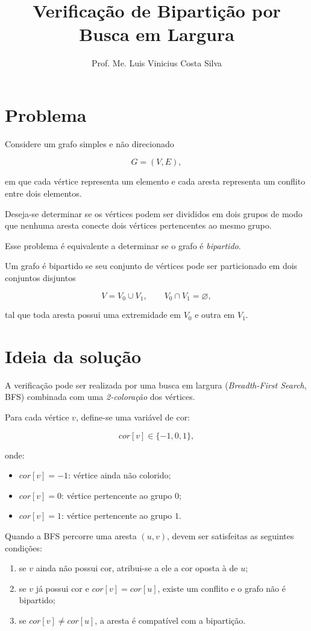 \documentclass[12pt,a4paper]{article}
\title{Verificação de Bipartição por Busca em Largura}
\author{Prof. Me. Luis Vinicius Costa Silva}
\date{}
\begin{document}
\maketitle

\section{Problema}

Considere um grafo simples e não direcionado

$$
G=(V,E),
$$

em que cada vértice representa um elemento e cada aresta representa
um conflito entre dois elementos.

Deseja-se determinar se os vértices podem ser divididos em dois grupos
de modo que nenhuma aresta conecte dois vértices pertencentes ao mesmo
grupo.

Esse problema é equivalente a determinar se o grafo é
\emph{bipartido}.

Um grafo é bipartido se seu conjunto de vértices pode ser particionado
em dois conjuntos disjuntos

$$
V=V_0\cup V_1,
\qquad
V_0\cap V_1=\varnothing,
$$

tal que toda aresta possui uma extremidade em $V_0$ e outra em $V_1$.

\section{Ideia da solução}

A verificação pode ser realizada por uma busca em largura
(\emph{Breadth-First Search}, BFS) combinada com uma
\emph{2-coloração} dos vértices.

Para cada vértice $v$, define-se uma variável de cor:

$$
cor[v]\in\{-1,0,1\},
$$

onde:

\begin{itemize}
\item $cor[v]=-1$: vértice ainda não colorido;
\item $cor[v]=0$: vértice pertencente ao grupo $0$;
\item $cor[v]=1$: vértice pertencente ao grupo $1$.
\end{itemize}

Quando a BFS percorre uma aresta $(u,v)$, devem ser satisfeitas as
seguintes condições:

\begin{enumerate}
\item se $v$ ainda não possui cor, atribui-se a ele a cor oposta
à de $u$;
\item se $v$ já possui cor e $cor[v]=cor[u]$, existe um conflito
e o grafo não é bipartido;
\item se $cor[v]\neq cor[u]$, a aresta é compatível com a
bipartição.
\end{enumerate}
\end{document}
